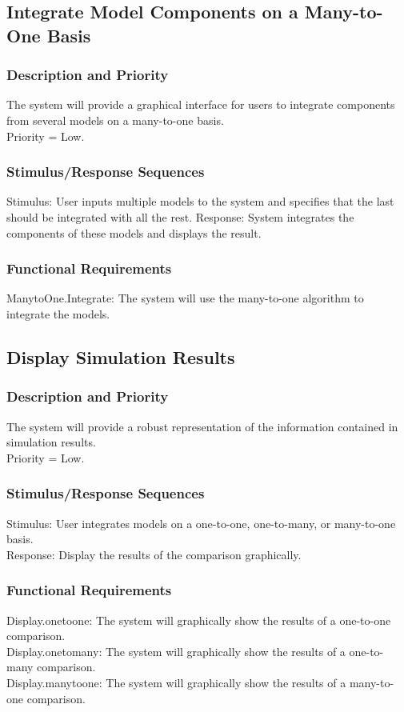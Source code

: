 \documentclass{article}
\begin{document}
\subsection{Integrate Model Components on a Many-to-One Basis}
\subsubsection{Description and Priority}
The system will provide a graphical interface for users to integrate components from several models on a many-to-one basis.\\
Priority = Low.

\subsubsection{Stimulus/Response Sequences}
Stimulus: User inputs multiple models to the system and specifies that the last should be integrated with all the rest.
Response: System integrates the components of these models and displays the result.

\subsubsection{Functional Requirements}
ManytoOne.Integrate: The system will use the many-to-one algorithm to integrate the models.

\subsection{Display Simulation Results}
\subsubsection{Description and Priority}
The system will provide a robust representation of the information contained in simulation results.\\
Priority = Low.

\subsubsection{Stimulus/Response Sequences}
Stimulus: User integrates models on a one-to-one, one-to-many, or many-to-one basis.\\
Response: Display the results of the comparison graphically.

\subsubsection{Functional Requirements}
Display.onetoone: The system will graphically show the results of a one-to-one comparison.\\
Display.onetomany: The system will graphically show the results of a one-to-many comparison.\\
Display.manytoone: The system will graphically show the results of a many-to-one comparison.
\end{document}
